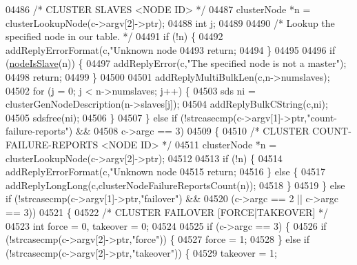 \begin{DoxyCode}
{{{{{{{{{{{{{{{{{{{{{{{{{{{{{{{{{{{{{{{{{{{{{{{{{{{{{{{{{{{{{{{{{{{{{{{{{{{{{{{{{{{{{{{{{{{{{{{{{{{{{{04486         \textcolor{comment}{/* CLUSTER SLAVES <NODE ID> */}
04487         clusterNode *n = clusterLookupNode(c->argv[2]->ptr);
04488         \textcolor{keywordtype}{int} j;
04489 
04490         \textcolor{comment}{/* Lookup the specified node in our table. */}
04491         \textcolor{keywordflow}{if} (!n) \{
04492             addReplyErrorFormat(c,\textcolor{stringliteral}{"Unknown node %
04493             \textcolor{keywordflow}{return};
04494         \}
04495 
04496         \textcolor{keywordflow}{if} (\hyperlink{cluster_8h_a3c99881f6892130c902b42b1f84a0e11}{nodeIsSlave}(n)) \{
04497             addReplyError(c,\textcolor{stringliteral}{"The specified node is not a master"});
04498             \textcolor{keywordflow}{return};
04499         \}
04500 
04501         addReplyMultiBulkLen(c,n->numslaves);
04502         \textcolor{keywordflow}{for} (j = 0; j < n->numslaves; j++) \{
04503             sds ni = clusterGenNodeDescription(n->slaves[j]);
04504             addReplyBulkCString(c,ni);
04505             sdsfree(ni);
04506         \}
04507     \} \textcolor{keywordflow}{else} \textcolor{keywordflow}{if} (!strcasecmp(c->argv[1]->ptr,\textcolor{stringliteral}{"count-failure-reports"}) &&
04508                c->argc == 3)
04509     \{
04510         \textcolor{comment}{/* CLUSTER COUNT-FAILURE-REPORTS <NODE ID> */}
04511         clusterNode *n = clusterLookupNode(c->argv[2]->ptr);
04512 
04513         \textcolor{keywordflow}{if} (!n) \{
04514             addReplyErrorFormat(c,\textcolor{stringliteral}{"Unknown node %
04515             \textcolor{keywordflow}{return};
04516         \} \textcolor{keywordflow}{else} \{
04517             addReplyLongLong(c,clusterNodeFailureReportsCount(n));
04518         \}
04519     \} \textcolor{keywordflow}{else} \textcolor{keywordflow}{if} (!strcasecmp(c->argv[1]->ptr,\textcolor{stringliteral}{"failover"}) &&
04520                (c->argc == 2 || c->argc == 3))
04521     \{
04522         \textcolor{comment}{/* CLUSTER FAILOVER [FORCE|TAKEOVER] */}
04523         \textcolor{keywordtype}{int} force = 0, takeover = 0;
04524 
04525         \textcolor{keywordflow}{if} (c->argc == 3) \{
04526             \textcolor{keywordflow}{if} (!strcasecmp(c->argv[2]->ptr,\textcolor{stringliteral}{"force"})) \{
04527                 force = 1;
04528             \} \textcolor{keywordflow}{else} \textcolor{keywordflow}{if} (!strcasecmp(c->argv[2]->ptr,\textcolor{stringliteral}{"takeover"})) \{
04529                 takeover = 1;
}}}}}}}}}}}}}}}}}}}}}}}}}}}}}}}}}}}}}}}}}}}}}}}}}}}}}}}}}}}}}}}}}}}}}}}}}}}}}}}}}}}}}}}}}}}}}}}}}}}}}}}}
\end{DoxyCode}
